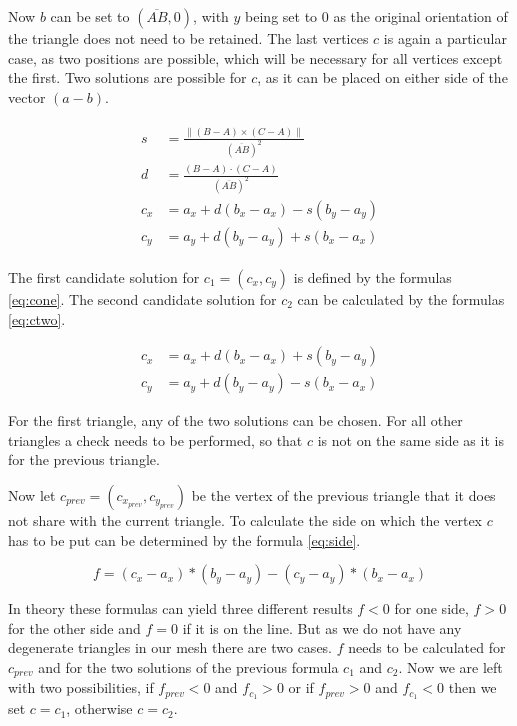 \documentclass[draft,final]{vutinfth} %
\begin{document}
Now $b$ can be set to $(\overline{AB}, 0)$, with $y$ being set to $0$ as the original orientation of the triangle does not need to be retained. The last vertices $c$ is again a particular case, as two positions are possible, which will be necessary for all vertices except the first. Two solutions are possible for $c$, as it can be placed on either side of the vector $(a-b)$. 

\begin{align}
\label{eq:cone}
\begin{split}
s &= \frac{\|(B - A)\times(C - A)\|}{(\overline{AB})^2}\\
d &= \frac{(B-A)\cdot(C-A)}{(\overline{AB})^2}\\
c_x &= a_x + d(b_x - a_x) - s(b_y - a_y)\\
c_y &= a_y + d(b_y - a_y) + s(b_x - a_x)
\end{split}
\end{align}

The first candidate solution for $c_1 = (c_x, c_y)$ is defined by the formulas \ref{eq:cone}. The second candidate solution for $c_2$ can be calculated by the formulas \ref{eq:ctwo}. 

\begin{equation}
\label{eq:ctwo}
\begin{split}
c_x &= a_x + d(b_x - a_x) + s(b_y - a_y)\\
c_y &= a_y + d(b_y - a_y) - s(b_x - a_x)
\end{split}
\end{equation}

For the first triangle, any of the two solutions can be chosen. For all other triangles a check needs to be performed, so that $c$ is not on the same side as it is for the previous triangle.


Now let $c_{prev} = (c_{x_{prev}},c_{y_{prev}})$ be the vertex of the previous triangle that it does not share with the current triangle. To calculate the side on which the vertex $c$ has to be put can be determined by the formula \ref{eq:side}.

\begin{equation}
\label{eq:side}
f = (c_x - a_x) * (b_y - a_y) - (c_y - a_y) * (b_x - a_x)
\end{equation}

In theory these formulas can yield three different results $f < 0$ for one side, $f > 0$ for the other side and $f = 0$ if it is on the line. But as we do not have any degenerate triangles in our mesh there are two cases. $f$ needs to be calculated for $c_{prev}$ and for the two solutions of the previous formula $c_1$ and $c_2$. Now we are left with two possibilities, if $f_{prev} < 0$ and $f_{c_1} > 0$ or if $f_{prev} > 0$ and $f_{c_1} < 0$ then we set $c = c_1$, otherwise $c = c_2$.
\end{document}
